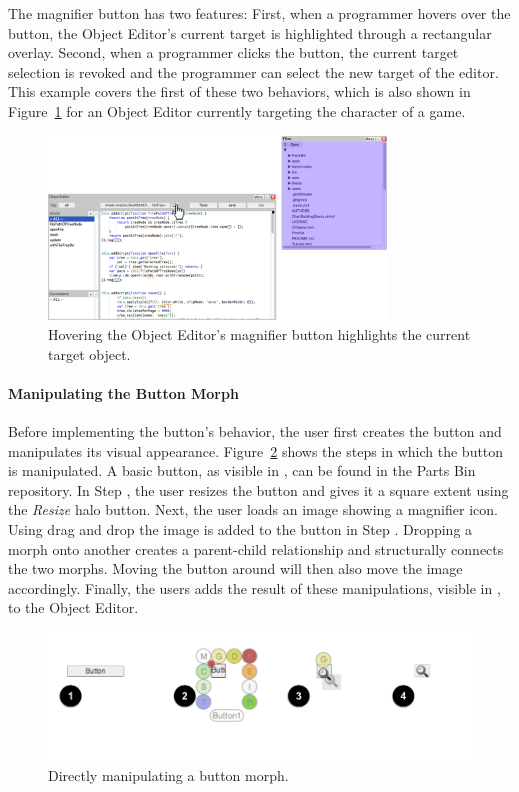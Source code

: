 The magnifier button has two features: First, when a programmer hovers over the button, the Object Editor's current target is highlighted through a rectangular overlay. Second, when a programmer clicks the button, the current target selection is revoked and the programmer can select the new target of the editor.
This example covers the first of these two behaviors, which is also shown in Figure~\ref{fig:MagnifierBehavior} for an Object Editor currently targeting the character of a game.

\begin{figure}[h]
    \centering
    \includegraphics[width=0.8\textwidth]{figures/3_motivation/2_magnifierBehavior.png}
    \caption{Hovering the Object Editor's magnifier button highlights the current target object.}
    \label{fig:MagnifierBehavior}
\end{figure}

\paragraph{Manipulating the Button Morph}
Before implementing the button's behavior, the user first creates the button and manipulates its visual appearance.
Figure~\ref{fig:ButtonBuilding} shows the steps in which the button is manipulated.
A basic button, as visible in , can be found in the Parts Bin repository.
In Step , the user resizes the button and gives it a square extent using the \emph{Resize} halo button.
Next, the user loads an image showing a magnifier icon.
Using drag and drop the image is added to the button in Step .
Dropping a morph onto another creates a parent-child relationship and structurally connects the two morphs.
Moving the button around will then also move the image accordingly.
Finally, the users adds the result of these manipulations, visible in , to the Object Editor.

\begin{figure}[h]
    \centering
    \includegraphics[width=\textwidth]{figures/3_motivation/3_buildingTheButton.png}
    \caption{Directly manipulating a button morph.}
    \label{fig:ButtonBuilding}
\end{figure}

